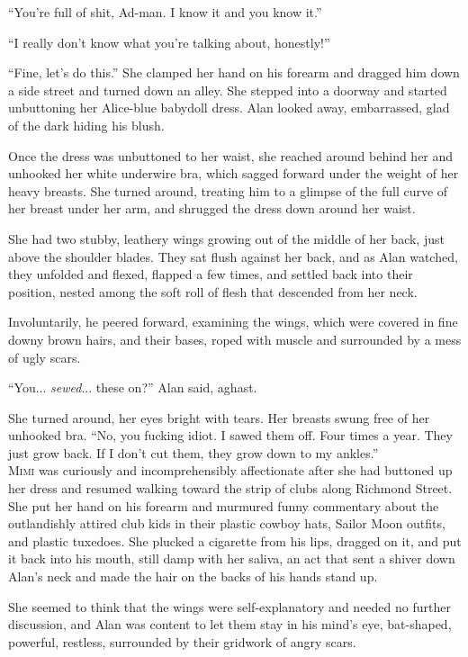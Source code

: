 \documentclass{article}
\begin{document}
``You're full of shit, Ad-man.  I know it and you know it.''

``I really don't know what you're talking about, honestly!''

``Fine, let's do this.'' She clamped her hand on his forearm and
dragged him down a side street and turned down an alley.  She stepped
into a doorway and started unbuttoning her Alice-blue babydoll dress. 
Alan looked away, embarrassed, glad of the dark hiding his blush.

Once the dress was unbuttoned to her waist, she reached around behind
her and unhooked her white underwire bra, which sagged forward under
the weight of her heavy breasts.  She turned around, treating him to a
glimpse of the full curve of her breast under her arm, and shrugged
the dress down around her waist.

She had two stubby, leathery wings growing out of the middle of her
back, just above the shoulder blades.  They sat flush against her
back, and as Alan watched, they unfolded and flexed, flapped a few
times, and settled back into their position, nested among the soft
roll of flesh that descended from her neck.

Involuntarily, he peered forward, examining the wings, which were
covered in fine downy brown hairs, and their bases, roped with muscle
and surrounded by a mess of ugly scars.

``You...  \textit{sewed}...  these on?'' Alan said, aghast.

She turned around, her eyes bright with tears.  Her breasts swung free
of her unhooked bra.  ``No, you fucking idiot.  I sawed them off. 
Four times a year.  They just grow back.  If I don't cut them, they
grow down to my ankles.''
\\
\lettrine[lines=3, lhang=.5, nindent=0pt, findent=2pt]{M}{imi} was curiously and incomprehensibly affectionate after she had
buttoned up her dress and resumed walking toward the strip of clubs
along Richmond Street.  She put her hand on his forearm and murmured
funny commentary about the outlandishly attired club kids in their
plastic cowboy hats, Sailor Moon outfits, and plastic tuxedoes.  She
plucked a cigarette from his lips, dragged on it, and put it back into
his mouth, still damp with her saliva, an act that sent a shiver down
Alan's neck and made the hair on the backs of his hands stand up.

She seemed to think that the wings were self-explanatory and needed no
further discussion, and Alan was content to let them stay in his
mind's eye, bat-shaped, powerful, restless, surrounded by their
gridwork of angry scars.
\end{document}

